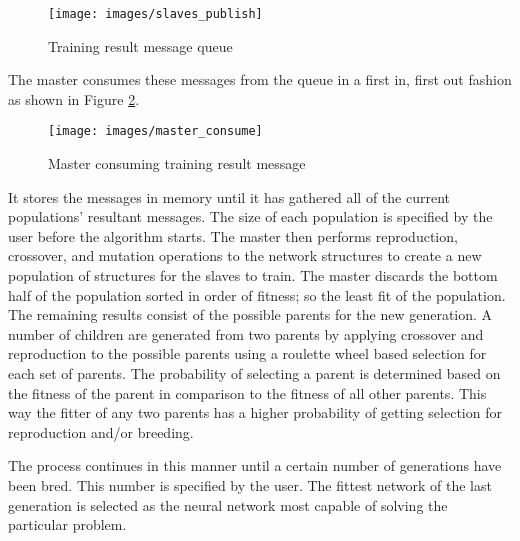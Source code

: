\begin{figure}[h!]
  \centering
  \texttt{[image: images/slaves\_publish]}
  \caption{Training result message queue}
  \label{slaves_publish}
\end{figure}

The master consumes these messages from the queue in a first in, first out fashion as shown in Figure \ref{master_consume}.

\begin{figure}[h!]
  \centering
  \texttt{[image: images/master\_consume]}
  \caption{Master consuming training result message}
  \label{master_consume}
\end{figure}

It stores the messages in memory until it has gathered all of the current populations' resultant messages. 
The size of each population is specified by the user before the algorithm starts.
The master then performs reproduction, crossover, and mutation operations to the network structures to create a new population of structures for the slaves to train.
The master discards the bottom half of the population sorted in order of fitness; so the least fit of the population. 
The remaining results consist of the possible parents for the new generation. 
A number of children are generated from two parents by applying crossover and reproduction to the possible parents using a roulette wheel based selection for each set of parents. 
The probability of selecting a parent is determined based on the fitness of the parent in comparison to the fitness of all other parents. 
This way the fitter of any two parents has a higher probability of getting selection for reproduction and/or breeding.

The process continues in this manner until a certain number of generations have been bred. 
This number is specified by the user. 
The fittest network of the last generation is selected as the neural network most capable of solving the particular problem.  

